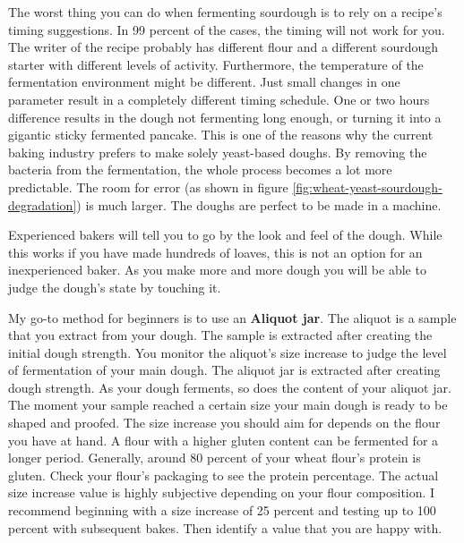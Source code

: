 The worst thing you can do when fermenting sourdough
is to rely on a recipe's timing suggestions. In 99 percent
of the cases, the timing will not work for you. The writer
of the recipe probably has different flour and a different
sourdough starter with different levels of activity. Furthermore,
the temperature of the fermentation environment might be
different. Just small changes in one parameter result
in a completely different timing schedule. One or two hours
difference results in the dough not fermenting long enough, or
turning it into a gigantic sticky fermented pancake. This
is one of the reasons why the current baking industry prefers
to make solely yeast-based doughs. By removing the bacteria
from the fermentation, the whole process becomes a lot more
predictable. The room for error (as shown in figure \ref{fig:wheat-yeast-sourdough-degradation})
is much larger. The doughs are perfect to be made in a
machine.

Experienced bakers will tell you to go by the look and feel of
the dough. While this works if you have made hundreds of loaves,
this is not an option for an inexperienced baker. As
you make more and more dough you will be able to judge
the dough's state by touching it.

My go-to method for beginners is to use an \textbf{Aliquot jar}.
The aliquot is a sample that you extract from your dough. The
sample is extracted after creating the initial dough strength.
You monitor the aliquot's size increase to judge the
level of fermentation of your main dough. The aliquot
jar is extracted after creating dough strength. As your
dough ferments, so does the content of your aliquot jar. The moment your
sample reached a certain size your main dough is ready
to be shaped and proofed. The size increase you should
aim for depends on the flour you have at hand. A flour
with a higher gluten content can be fermented for a
longer period. Generally, around 80 percent
of your wheat flour's protein is gluten. Check your flour's
packaging to see the protein percentage. The actual size increase
value is highly subjective depending on your flour composition.
I recommend beginning with a size increase of 25 percent and testing
up to 100 percent with subsequent bakes. Then identify a value
that you are happy with.

